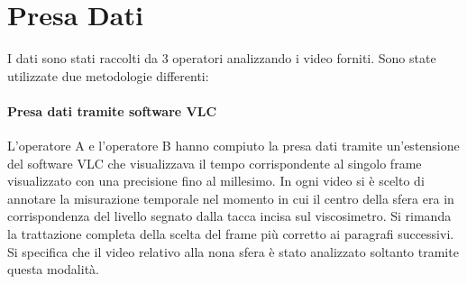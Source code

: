 \documentclass[a4paper,11pt,oneside]{article}
\begin{document}
\bigskip
\bigskip
\bigskip
\bigskip
\bigskip
\begin{table}[h!]
    \centering
    \caption{Diametri Sferette}
    \label{tab:diametri_sfere}
\end{table}


\clearpage
\section{Presa Dati}
I dati sono stati raccolti da 3 operatori analizzando i video forniti.
Sono state utilizzate due metodologie differenti:

\paragraph{Presa dati tramite software VLC}
L'operatore A e l'operatore B hanno compiuto la presa dati tramite un'estensione del software VLC che visualizzava il tempo corrispondente al singolo frame visualizzato con una precisione fino al millesimo. In ogni video si è scelto di annotare la misurazione temporale nel momento in cui il centro della sfera era in corrispondenza del livello segnato dalla tacca incisa sul viscosimetro.
Si rimanda la trattazione completa della scelta del frame più corretto ai paragrafi successivi.
Si specifica che il video relativo alla nona sfera è stato analizzato soltanto tramite questa modalità.
\end{document}
